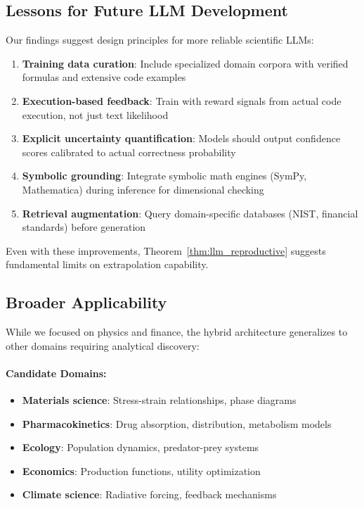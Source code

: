 \subsection{Lessons for Future LLM Development}

Our findings suggest design principles for more reliable scientific LLMs:

\begin{enumerate}
\item \textbf{Training data curation}: Include specialized domain corpora with verified formulas and extensive code examples

\item \textbf{Execution-based feedback}: Train with reward signals from actual code execution, not just text likelihood

\item \textbf{Explicit uncertainty quantification}: Models should output confidence scores calibrated to actual correctness probability

\item \textbf{Symbolic grounding}: Integrate symbolic math engines (SymPy, Mathematica) during inference for dimensional checking

\item \textbf{Retrieval augmentation}: Query domain-specific databases (NIST, financial standards) before generation
\end{enumerate}

Even with these improvements, Theorem~\ref{thm:llm_reproductive} suggests fundamental limits on extrapolation capability.

\subsection{Broader Applicability}

While we focused on physics and finance, the hybrid architecture generalizes to other domains requiring analytical discovery:

\paragraph{Candidate Domains:}
\begin{itemize}
\item \textbf{Materials science}: Stress-strain relationships, phase diagrams
\item \textbf{Pharmacokinetics}: Drug absorption, distribution, metabolism models
\item \textbf{Ecology}: Population dynamics, predator-prey systems
\item \textbf{Economics}: Production functions, utility optimization
\item \textbf{Climate science}: Radiative forcing, feedback mechanisms
\end{itemize}

